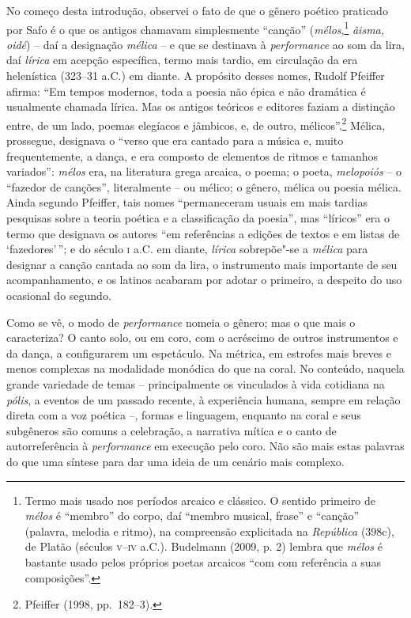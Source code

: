 No começo desta introdução, observei o fato de que o gênero poético praticado
por Safo é o que os antigos chamavam simplesmente “canção”
(\textit{mélos},\footnote{ Termo mais usado nos períodos arcaico e clássico.
O sentido primeiro de \textit{mélos} é “membro” do corpo, daí “membro
musical, frase” e “canção” (palavra, melodia e ritmo), na compreensão
explicitada na \textit{República} (398c), de Platão (séculos \textsc{v}--\textsc{iv} a.C.).
Budelmann (2009, p. 2) lembra que \textit{mélos} é bastante usado pelos próprios poetas arcaicos ``com com referência a suas composições”.} \textit{âisma, oidé}) -- daí a
designação \textit{mélica} -- e que se destinava à \textit{performance} ao som
da lira, daí \textit{lírica} em acepção específica, termo mais tardio, em
circulação da era helenística (323--31 a.C.) em diante. A propósito
desses nomes, Rudolf Pfeiffer afirma: “Em tempos
modernos, toda a poesia não épica e não dramática é usualmente chamada lírica.
Mas os antigos teóricos e editores faziam a distinção entre, de um lado, poemas
elegíacos e jâmbicos, e, de outro, mélicos”.\footnote{ Pfeiffer (1998, pp.~182--3).} Mélica, prossegue,
designava o “verso que era cantado para a música e, muito frequentemente, a
dança, e era composto de elementos de ritmos e tamanhos variados”:
\textit{mélos} era, na literatura grega arcaica, o poema; o poeta,
\textit{melopoiós} -- o “fazedor de canções”, literalmente -- ou mélico; o
gênero, mélica ou poesia mélica. Ainda segundo Pfeiffer, tais nomes
“permaneceram usuais em mais tardias pesquisas sobre a teoria poética e a
classificação da poesia”, mas “líricos” era o termo que designava os autores
“em referências a edições de textos e em listas de ‘fazedores’\,”; e do século \textsc{i}
a.C. em diante, \textit{lírica} sobrepõe"-se a \textit{mélica} para designar a canção
cantada ao som da lira, o instrumento mais importante de seu acompanhamento, e
os latinos acabaram por adotar o primeiro, a despeito do uso ocasional do
segundo.

Como se vê, o modo de \textit{performance} nomeia o gênero;
mas o que mais o caracteriza? O canto solo,
ou em coro, com o acréscimo de
outros instrumentos e da dança, a configurarem um espetáculo. Na métrica,
em estrofes mais breves e menos
complexas na modalidade monódica do que na coral. No conteúdo, naquela grande variedade de temas -- principalmente os vinculados à
vida cotidiana na \textit{pólis}, a eventos de um passado recente, à
experiência humana, sempre em relação direta com a voz poética --, formas e
linguagem, enquanto na coral e seus subgêneros são comuns a celebração, a
narrativa mítica e o canto de autorreferência à \textit{performance} em
execução pelo coro. Não são mais estas palavras do que uma síntese para dar uma ideia de um cenário mais complexo. 

